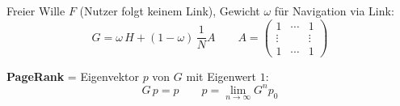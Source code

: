 Freier Wille $F$ (Nutzer folgt keinem Link), Gewicht $\omega$ für Navigation via Link:
$$ \boxed{ G = \omega \, H + (1-\omega) \, \frac{1}{N} A } \qquad A = \begin{pmatrix} 1 & \cdots & 1 \\ \vdots & & \vdots \\ 1 & \cdots & 1 \end{pmatrix} $$

\textbf{PageRank} = Eigenvektor $p$ von $G$ mit Eigenwert $1$:
$$ \boxed{ G \, p = p } \qquad p = \lim_{n \to \infty} G^n p_0 $$